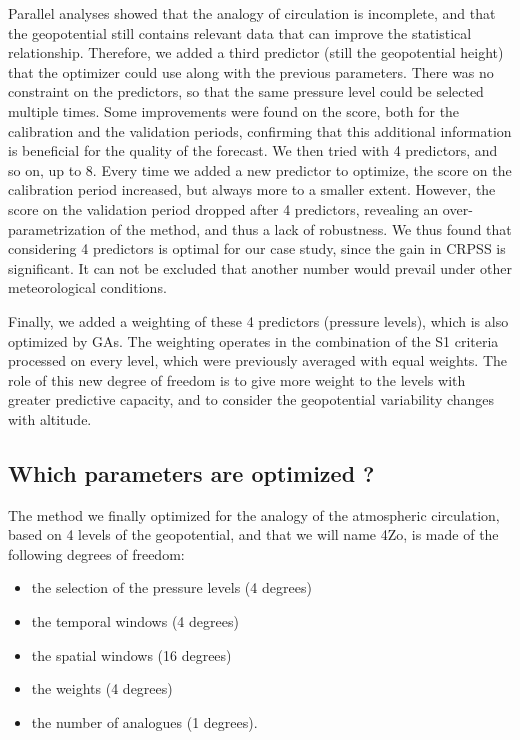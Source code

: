 \documentclass[5p]{elsarticle}
\begin{document}
Parallel analyses showed that the analogy of circulation is incomplete, and that the geopotential still contains relevant data that can improve the statistical relationship. Therefore, we added a third predictor (still the geopotential height) that the optimizer could use along with the previous parameters. There was no constraint on the predictors, so that the same pressure level could be selected multiple times. Some improvements were found on the score, both for the calibration and the validation periods, confirming that this additional information is beneficial for the quality of the forecast. We then tried with 4 predictors, and so on, up to 8. Every time we added a new predictor to optimize, the score on the calibration period increased, but always more to a smaller extent. However, the score on the validation period dropped after 4 predictors, revealing an over-parametrization of the method, and thus a lack of robustness. We thus found that considering 4 predictors is optimal for our case study, since the gain in CRPSS is significant. It can not be excluded that another number would prevail under other meteorological conditions.

Finally, we added a weighting of these 4 predictors (pressure levels), which is also optimized by GAs. The weighting operates in the combination of the S1 criteria processed on every level, which were previously averaged with equal weights. The role of this new degree of freedom is to give more weight to the levels with greater predictive capacity, and to consider the geopotential variability changes with altitude. 


\subsection{Which parameters are optimized ?}

The method we finally optimized for the analogy of the atmospheric circulation, based on 4 levels of the geopotential, and that we will name 4Zo, is made of the following degrees of freedom:

\begin{itemize}
	\setlength\itemsep{-4px}
	\item the selection of the pressure levels (4 degrees)
	\item the temporal windows (4 degrees)
	\item the spatial windows (16 degrees)
	\item the weights (4 degrees)
	\item the number of analogues (1 degrees).
\end{itemize}
\end{document}
